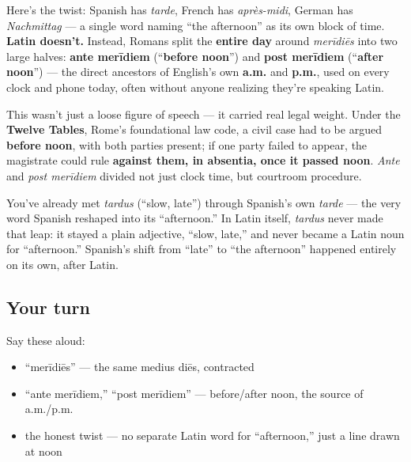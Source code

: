\begin{culture}
Here's the twist: Spanish has \emph{tarde}, French has \emph{après-midi}, German has \emph{Nachmittag} — a single word naming \textquotedblleft{}the afternoon\textquotedblright{} as its own block of time. \textbf{Latin doesn't.} Instead, Romans split the \textbf{entire day} around \emph{merīdiēs} into two large halves: \textbf{ante merīdiem} (\textquotedblleft{}\textbf{before noon}\textquotedblright{}) and \textbf{post merīdiem} (\textquotedblleft{}\textbf{after noon}\textquotedblright{}) — the direct ancestors of English's own \textbf{a.m.} and \textbf{p.m.}, used on every clock and phone today, often without anyone realizing they're speaking Latin.

This wasn't just a loose figure of speech — it carried real legal weight. Under the \textbf{Twelve Tables}, Rome's foundational law code, a civil case had to be argued \textbf{before noon}, with both parties present; if one party failed to appear, the magistrate could rule \textbf{against them, in absentia, once it passed noon}. \emph{Ante} and \emph{post merīdiem} divided not just clock time, but courtroom procedure.
\end{culture}

\begin{cousinweb}
You've already met \emph{tardus} (\textquotedblleft{}slow, late\textquotedblright{}) through Spanish's own \emph{tarde} — the very word Spanish reshaped into its \textquotedblleft{}afternoon.\textquotedblright{} In Latin itself, \emph{tardus} never made that leap: it stayed a plain adjective, \textquotedblleft{}slow, late,\textquotedblright{} and never became a Latin noun for \textquotedblleft{}afternoon.\textquotedblright{} Spanish's shift from \textquotedblleft{}late\textquotedblright{} to \textquotedblleft{}the afternoon\textquotedblright{} happened entirely on its own, after Latin.
\end{cousinweb}

\subsection*{Your turn}
Say these aloud:

\begin{itemize}
\raggedright
  \item \textquotedblleft{}merīdiēs\textquotedblright{} — the same medius diēs, contracted
  \item \textquotedblleft{}ante merīdiem,\textquotedblright{} \textquotedblleft{}post merīdiem\textquotedblright{} — before/after noon, the source of a.m./p.m.
  \item the honest twist — no separate Latin word for \textquotedblleft{}afternoon,\textquotedblright{} just a line drawn at noon
\end{itemize}

